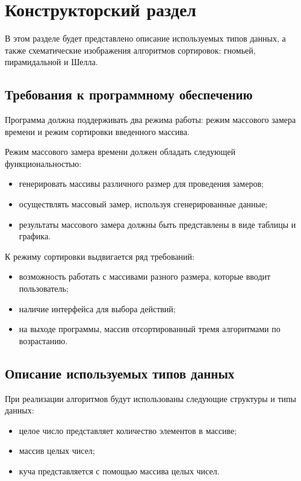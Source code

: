 \chapter{Конструкторский раздел}

В этом разделе будет представлено описание используемых типов данных, а также схематические изображения алгоритмов сортировок: гномьей, пирамидальной и Шелла.

\section{Требования к программному обеспечению}

Программа должна поддерживать два режима работы: режим массового замера времени и режим сортировки введенного массива.

Режим массового замера времени должен обладать следующей функциональностью:
\begin{itemize}
	\item генерировать массивы различного размер для проведения замеров;
	\item осуществлять массовый замер, используя сгенерированные данные;
	\item результаты массового замера должны быть представлены в виде таблицы и графика.
\end{itemize}

К режиму сортировки выдвигается ряд требований:
\begin{itemize}
	\item возможность работать с массивами разного размера, которые вводит пользователь;
	\item наличие интерфейса для выбора действий;
	\item на выходе программы, массив отсортированный тремя алгоритмами по возрастанию.
\end{itemize}

\section{Описание используемых типов данных}

При реализации алгоритмов будут использованы следующие структуры и типы данных:
\begin{itemize}
	\item целое число представляет количество элементов в массиве;
	\item массив целых чисел;
	\item куча представляется с помощью массива целых чисел.
\end{itemize}

